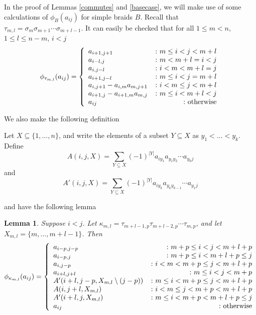 \documentclass{amsart}[11pt,fullpage]
\def\ltblue{blue!20!white}
\def\s{{\sigma}}
\def\t{{\tau}}
\newtheorem{lem}[thm]{Lemma}
\theoremstyle{definition}
\begin{document}
In the proof of Lemmas \ref{commutes} and \ref{basecase}, we will make use of some calculations of $\phi_B(a_{ij})$ for simple braids $B$. Recall that $\tau_{m,l} = \s_m\s_{m+1}\cdots\s_{m+l-1}$. It can easily be checked that for all $1\le m < n$, $1\le l \le n - m$, $i<j$
\begin{equation}\label{tau}
\phi_{\tau_{m,l}}(a_{ij}) =
\left\{
     \begin{array}{lr}
       a_{i+1,j+1} & \colon m\le i<j< m+l\\
       a_{i-l,j} & \colon m<m+l=i<j\\
       a_{i,j-l} & \colon i<m<m+l=j\\
       a_{i+1,j-l} & \colon m\le i < j = m+l\\
       a_{i,j+1}-a_{i,m}a_{m,j+1} & \colon i<m\le j< m+l\\
       a_{i+1,j}-a_{i+1,m}a_{m,j} & \colon m\le i< m+l<j\\
       a_{ij} & \colon \textnormal{otherwise}
     \end{array}
\right.
\end{equation}

\noindent We also make the following definition

\noindent Let $X\subseteq \{1,\ldots,n\}$, and write the elements of a subset $Y\subseteq X$ as $y_1<\ldots <y_k$. Define
$$
 A(i,j,X) = \sum_{Y\subseteq X}(-1)^{|Y|}a_{iy_1}a_{y_1y_2}\cdots a_{y_kj}
$$
and
$$
 A'(i,j,X) = \sum_{Y\subseteq X}(-1)^{|Y|}a_{iy_k}a_{y_ky_{k-1}}\cdots a_{y_1j}
$$



\noindent and have the following lemma

\begin{lem}\label{Sigma_n}
Suppose $i<j$. Let $\kappa_{m,l} = \t_{m+l-1,p}\t_{m+l-2,p}\cdots\t_{m,p}$, and let $X_{m,l} = \{m,\ldots,m+l-1\}$. Then
\todo[color=\ltblue]{check}
$$
\phi_{\kappa_{m,l}}(a_{ij}) =
\left\{
     \begin{array}{lr}
       a_{i-p,j-p} & \colon m+p\le i<j< m+l+p\\
       a_{i-p,j} &\colon m+p\le i< m+l+p\le j\\
       a_{i,j-p} & \colon i<m<m+p\le j<m+l+p\\
       a_{i+l,j+l} &\colon m\le i<j<m+p\\
       A'(i+l,j-p,X_{m,l}\setminus (j-p)) & \colon m\le i<m+p\le j <m+l+p\\
       A(i,j+l,X_{m,l}) & \colon i<m\le j <m+p<m+l+p\\
       A'(i+l,j,X_{m,l}) & \colon m\le i <m+p<m+l+p\le j\\
       a_{ij} & \colon \textnormal{otherwise}
     \end{array}
\right.
$$
\end{lem}
\end{document}
